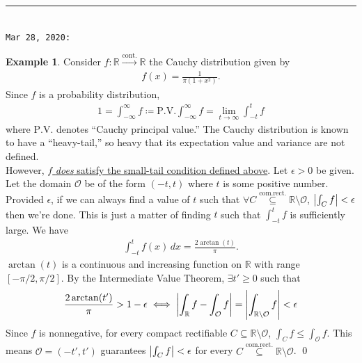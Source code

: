 \documentclass{article}
\theoremstyle{definition}
\newtheorem{exmp}{Example}[section]
\newcommand{\f}[2]{\frac{#1}{#2}}
\begin{document}
\hrule


$\,$\\


\noindent \texttt{Mar 28, 2020:} \\




\begin{exmp}
Consider $f: \mathbb{R} \xrightarrow{\text{cont.}} \mathbb{R}$ the Cauchy distribution given by
\begin{align*}
    f(x) = \f{1}{\pi(1+x^2)}.
\end{align*}
Since $f$ is a probability distribution, 
\begin{align*}
    1 = \int^\infty_{-\infty} f \coloneqq \text{P.V.} \int^\infty_{-\infty}f =\lim\limits_{t\to\infty}\int^t_{-t}f  
\end{align*}
where $\text{P.V.}$ denotes ``Cauchy principal value.'' The Cauchy distribution is known to have a ``heavy-tail,'' so heavy that its expectation value and variance are not defined. \\ 

However, \underline{$f$ \textit{does} satisfy the small-tail condition defined above}. Let $\epsilon > 0$ be given. Let the domain $\mathcal{O}$ be of the form $(-t,t)$ where $t$ is some positive number. Provided $\epsilon$, if we can always find a value of $t$ such that $\forall C \overset{\text{com.rect.}}{\subseteq} \mathbb{R}\setminus \mathcal{O}$, $\abs{\int_C f} < \epsilon$ then we're done. This is just a matter of finding $t$ such that ${\int^t_{-t}f}$ is sufficiently large. We have
\begin{align*}
    \int^t_{-t}f(x)\,dx = \f{2\arctan(t)}{\pi}.
\end{align*}
$\arctan(t)$ is a continuous and increasing function on $\mathbb{R}$ with range $[-\pi/2,\pi/2]$. By the Intermediate Value Theorem, $\exists t' \geq 0$ such that
\begin{align*}
\f{2\arctan(t')}{\pi} > 1-\epsilon \iff \abs{\int_\mathbb{R} f - \int_\mathcal{O}f} = \abs{\int_{\mathbb{R}\setminus\mathcal{O}}f} < \epsilon
\end{align*}
Since $f$ is nonnegative, for every compact rectifiable $C \subseteq \mathbb{R}\setminus\mathcal{O}$, $\int_C f \leq \int_\mathcal{O}f$. This means $\mathcal{O} = (-t',t')$ guarantees $\abs{\int_C f} < \epsilon$ for every $C \overset{\text{com.rect.}}{\subseteq} \mathbb{R}\setminus \mathcal{O}$. \qed\\







\end{exmp}
\end{document}
